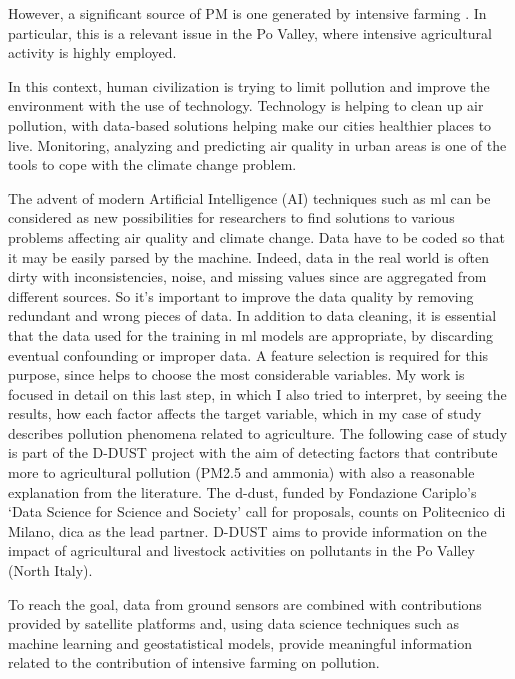 However, a significant source of PM is one generated by intensive farming \cite{burkart2007diffuse}.
In particular, this is a relevant issue in the Po Valley, where intensive agricultural activity is highly employed.\par
In this context, human civilization is trying to limit pollution and improve the environment with the use of technology.\newline
Technology is helping to clean up air pollution, with data-based solutions helping make our cities healthier places to live.\newline
Monitoring, analyzing and predicting air quality in urban areas is one of the tools to cope with the climate change problem.\par
The advent of modern Artificial Intelligence (AI) techniques such as \gls{ml} can be considered as new possibilities for researchers to find solutions to various problems affecting air quality and climate change.
\bigskip
Data have to be coded so that it may be easily parsed by the machine. 
Indeed, data in the real world is often dirty with inconsistencies, noise, and missing values since are aggregated from different sources. So it's important to improve the data quality by removing redundant and wrong pieces of data.
In addition to data cleaning, it is essential that the data used for the training in \acrshort{ml} models are appropriate, by discarding eventual confounding or improper data.
A feature selection is required for this purpose, since helps to choose the most considerable variables.
My work is focused in detail on this last step, in which I also tried to interpret, by seeing the results, how each factor affects the target variable, which in my case of study describes pollution phenomena related to agriculture.
The following case of study is part of the D-DUST project with the aim of detecting factors that contribute more to agricultural pollution (PM2.5 and ammonia) with also a reasonable explanation from the literature.
The \gls{d-dust}, funded by Fondazione Cariplo’s ‘Data Science for Science and Society’ call for proposals, counts on Politecnico di Milano, \gls{dica} as the lead partner.\newline
D-DUST aims to provide information on the impact of agricultural and livestock activities on pollutants in the Po Valley (North Italy).\par 
To reach the goal, data from ground sensors are combined with contributions provided by satellite platforms and, using data science techniques such as machine learning and geostatistical models, provide meaningful information related to the contribution of intensive farming on pollution.\par
